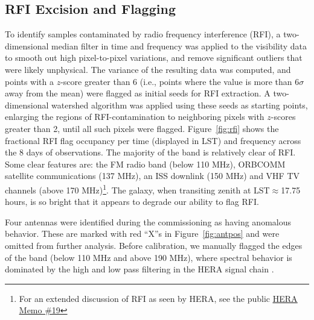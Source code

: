 \documentclass[twocolumn, trackchanges]{aastex61}
\begin{document}
\subsection{RFI Excision and Flagging}

To identify samples contaminated by radio frequency interference (RFI), a
two-dimensional median filter in time and frequency was applied to the
visibility data to smooth out high pixel-to-pixel variations, and remove
significant outliers that were likely unphysical. The variance of the resulting
data was computed, and points with a $z$-score greater than 6 (i.e., points
where the value is more than 6$\sigma$ away from the mean) were flagged as
initial seeds for RFI extraction. A two-dimensional watershed algorithm was
applied using these seeds as starting points, enlarging the regions of
RFI-contamination to neighboring pixels with $z$-scores greater than 2, until
all such pixels were flagged. Figure~\ref{fig:rfi} shows the fractional RFI flag
occupancy per time (displayed in LST) and frequency across the 8 days of
observations. The majority of the band is relatively clear of RFI. Some clear
features are: the FM radio band (below 110 MHz), ORBCOMM satellite
communications (137 MHz), an ISS downlink (150 MHz) and VHF TV channels (above
170 MHz)\footnote{For an extended discussion of RFI as seen by HERA, see the
  public
  \href{http://reionization.org/wp-content/uploads/2013/03/HERAMemo19_HERA_dish_RFI.pdf}{\underline{HERA
      Memo \#19}}}.  The galaxy, when transiting zenith at LST$\approx$17.75
hours, is so bright that it appears to degrade our ability to flag RFI.

Four antennas were identified during the commissioning as having anomalous
behavior. These are marked with red ``X''s in Figure~\ref{fig:antpos} and were
omitted from further analysis.  Before calibration, we manually flagged the
edges of the band (below 110 MHz and above 190 MHz), where spectral behavior is
dominated by the high and low pass filtering in the HERA signal chain
\citep{deBoer17}.
\end{document}
